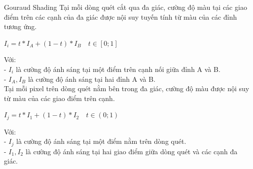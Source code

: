\documentclass[11pt, aspectratio=169]{beamer}
\begin{document}
\begin{frame}{Gouraud Shading}
	Tại mỗi dòng quét cắt qua đa giác, cường độ màu tại các giao điểm trên các cạnh của đa giác được nội suy tuyến tính từ màu của các đỉnh tương ứng.\\
	\begin{center}
		\begin{math}
			I_i = t * I_A + (1 - t) * I_B \quad t \in [0; 1]
		\end{math}
	\end{center}
%	
	Với:\\
	- $I_i$ là cường độ ánh sáng tại một điểm trên cạnh nối giữa đỉnh A và B.\\
	- $I_A, I_B$ là cường độ ánh sáng tại hai đỉnh A và B.\\
%	
	Tại mỗi pixel trên dòng quét nằm bên trong đa giác, cường độ màu được nội suy từ màu của các giao điểm trên cạnh.\\
	\begin{center}
		\begin{math}
			I_j = t * I_1 + (1 - t) * I_2 \quad t \in (0; 1)
		\end{math}
	\end{center}
%	
	Với:\\
	- $I_j$ là cường độ ánh sáng tại một điểm nằm trên dòng quét.\\
	- $I_1, I_2$ là cường độ ánh sáng tại hai giao điểm giữa dòng quét và các cạnh đa giác.
\end{frame}
\end{document}
